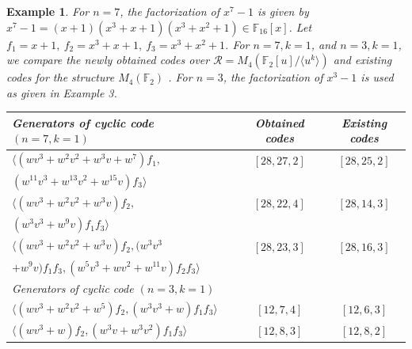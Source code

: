 \documentclass{amsart}
\newtheorem{example}[theorem]{Example}
\theoremstyle{definition}
\theoremstyle{remark}
\numberwithin{equation}{section}
\begin{document}
 \begin{example}
      For $n=7$, the factorization of $x^7-1$ is given by $x^7-1=(x+1)(x^3 + x + 1)(x^3 + x^2 + 1)\in \mathbb F_{16}[x]$. Let $f_1=x+1,~f_2=x^3 + x + 1,~f_3=x^3 + x^2 + 1$. For $n=7,k=1$, and $n=3,k=1$, {we compare the newly obtained codes over $\mathcal{R}=M_4 (\mathbb F_2 [u]/ \langle u^k \rangle)$ and existing codes for the structure $M_4(\mathbb{F}_2)$ \cite{Pal}.} For $n=3$, the factorization of $x^3-1$ is used as given in Example 3.
      
       
       \renewcommand{\arraystretch}{1.2}\begin{longtable}{  | p{6cm} | c | c |} \hline
        Generators of cyclic code $(n=7,k=1)$ & Obtained codes & Existing codes \cite{Pal} \\\hline
        $\langle (w v^3+w^2v^2+w^3v+w^7)f_1,$ & $[28,27,2]$ & $[28,25,2]$ \\
           $ (w^{11} v^3+w^{13}v^2+w^{15}v)f_3\rangle$     & & \\


        $\langle (w v^3+w^2v^2+w^3v)f_2, $ & $[28,22,4]$ & $[28,14,3]$ \\
        $(w^{3} v^3+w^{9}v)f_1f_3\rangle $ & & \\
        $\langle (w v^3+w^2v^2+w^3v)f_2, (w^{3} v^3 $ & $[28,23,3]$ & $[28,16,3]$ \\
        $+w^{9}v)f_1f_3, (w^5v^3+w v^2+w^{11}v)f_2f_3\rangle$ & & \\
          \hline
          Generators of cyclic code $(n=3,k=1)$ &  &  \\\hline
        $\langle (w v^3+w^2v^2 + w^5)f_2, (w^3v^3+w)f_1f_3\rangle$ & $[12,7,4]$ & $[12,6,3]$ \\
        $\langle (w v^3+w)f_2, (w^{3}v+w^{3}v^2)f_1f_3\rangle$ & $[12,8,3]$ & $[12,8,2]$ \\ \hline
       \end{longtable}
 \end{example}
\end{document}
